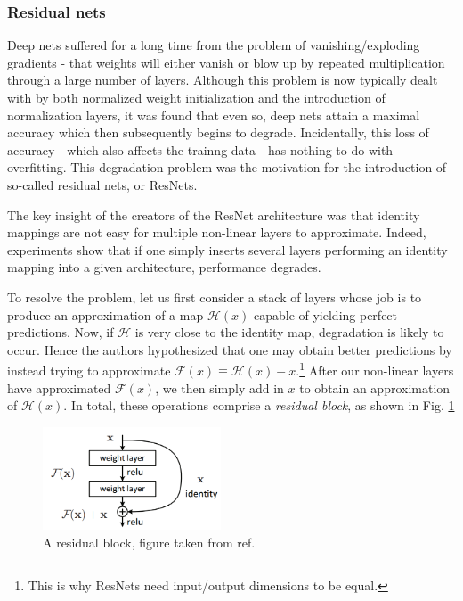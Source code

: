 \documentclass[]{article}
\begin{document}
\subsubsection{Residual nets}
Deep nets suffered for a long time from the problem of vanishing/exploding gradients - that weights will either vanish or blow up by repeated multiplication through a large number of layers. Although this problem is now typically dealt with by both normalized weight initialization and the introduction of normalization layers\cite{LeCun2012}, it was found that even so, deep nets attain a maximal accuracy which then subsequently begins to degrade.\cite{degrad} Incidentally, this loss of accuracy - which also affects the trainng data - has nothing to do with overfitting. This degradation problem was the motivation for the introduction of so-called residual nets, or ResNets.\cite{resnet}

The key insight of the creators of the ResNet architecture was that identity mappings are not easy for multiple non-linear layers to approximate. Indeed, experiments show that if one simply inserts several layers performing an identity mapping into a given architecture, performance degrades. 

To resolve the problem, let us first consider a stack of layers whose job is to produce an approximation of a map $\mathcal{H}(x)$ capable of yielding perfect predictions. Now, if $\mathcal{H}$ is very close to the identity map, degradation is likely to occur. Hence the authors hypothesized that one may obtain better predictions by instead trying to approximate $\mathcal{F}(x) \equiv \mathcal{H}(x) - x$.\footnote{This is why ResNets need input/output dimensions to be equal.} After our non-linear layers have approximated $\mathcal{F}(x)$, we then simply add in $x$ to obtain an approximation of $\mathcal{H}(x)$. In total, these operations comprise a \textit{residual block}, as shown in Fig. \ref{fig:residual_block}

\begin{figure}
	\centering
	\includegraphics[width=200px]{residual_block.png}
	\caption{A residual block, figure taken from ref. \cite{resnet}}
	\label{fig:residual_block}
\end{figure}
\end{document}

